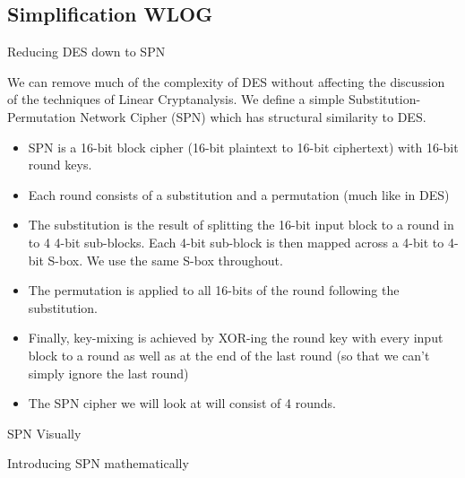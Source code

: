 \documentclass[9pt]{beamer}
\begin{document}
\subsection{Simplification WLOG}
\begin{frame}
Reducing DES down to SPN

We can remove much of the complexity of DES without affecting the discussion of the techniques of Linear Cryptanalysis. We define a simple Substitution-Permutation Network Cipher (SPN) which has structural similarity to DES.

\begin{itemize}
\item SPN is a 16-bit block cipher (16-bit plaintext to 16-bit ciphertext) with 16-bit round keys.
\item Each round consists of a substitution and a permutation (much like in DES)
\item The substitution is the result of splitting the 16-bit input block to a round in to 4 4-bit sub-blocks. Each 4-bit sub-block is then mapped across a 4-bit to 4-bit S-box. We use the same S-box throughout. 
\item The permutation is applied to all 16-bits of the round following the substitution.
\item Finally, key-mixing is achieved by XOR-ing the round key with every input block to a round as well as at the end of the last round (so that we can't simply ignore the last round)
\item The SPN cipher we will look at will consist of 4 rounds.
\end{itemize}


\end{frame}

\begin{frame}
SPN Visually
\end{frame}

\begin{frame}
Introducing SPN mathematically

\end{frame}
\end{document}
